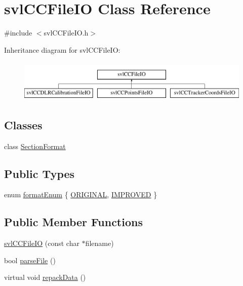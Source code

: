 \hypertarget{classsvl_c_c_file_i_o}{}\section{svl\+C\+C\+File\+I\+O Class Reference}
\label{classsvl_c_c_file_i_o}


{\ttfamily \#include $<$svl\+C\+C\+File\+I\+O.\+h$>$}

Inheritance diagram for svl\+C\+C\+File\+I\+O\+:\begin{figure}[H]
\begin{center}
\leavevmode
\includegraphics[height=2.000000cm]{db/d3d/classsvl_c_c_file_i_o}
\end{center}
\end{figure}
\subsection*{Classes}
\begin{DoxyCompactItemize}
\item 
class \hyperlink{classsvl_c_c_file_i_o_1_1_section_format}{Section\+Format}
\end{DoxyCompactItemize}
\subsection*{Public Types}
\begin{DoxyCompactItemize}
\item 
enum \hyperlink{classsvl_c_c_file_i_o_a611d26ef01a82b0e1712aacd0994dfca}{format\+Enum} \{ \hyperlink{classsvl_c_c_file_i_o_a611d26ef01a82b0e1712aacd0994dfcaa7a3cb50b00a1186d5597ac007af54666}{O\+R\+I\+G\+I\+N\+A\+L}, 
\hyperlink{classsvl_c_c_file_i_o_a611d26ef01a82b0e1712aacd0994dfcaa170fa673651c22bf74d38e428f607d0b}{I\+M\+P\+R\+O\+V\+E\+D}
 \}
\end{DoxyCompactItemize}
\subsection*{Public Member Functions}
\begin{DoxyCompactItemize}
\item 
\hyperlink{classsvl_c_c_file_i_o_a7d06350895bcddeecb0a7ccf47b0fbbd}{svl\+C\+C\+File\+I\+O} (const char $\ast$filename)
\item 
bool \hyperlink{classsvl_c_c_file_i_o_a29c1a5e45b1243669045dd99a381146d}{parse\+File} ()
\item 
virtual void \hyperlink{classsvl_c_c_file_i_o_ab98a5780429fa2a83ffd118c00cf4d27}{repack\+Data} ()
\end{DoxyCompactItemize}
